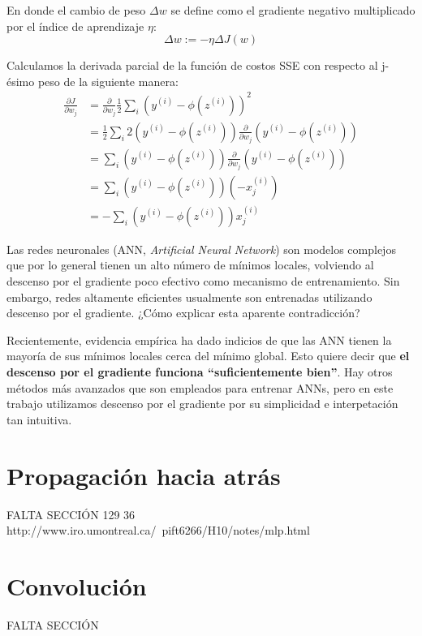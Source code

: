 En donde el cambio de peso $\Delta w$ se define como el gradiente negativo multiplicado
por el índice de aprendizaje $\eta$:
\begin{equation}
  \Delta w := -\eta \Delta J(w)
\end{equation}

Calculamos la derivada parcial de la función de costos SSE con respecto al
j-ésimo peso de la siguiente manera:
\begin{equation*}
\begin{split}
  \frac{\partial J}{\partial w_j} &= \frac{\partial}{\partial w_j}\frac{1}{2}\sum_i (y^{(i)} - \phi(z^{(i)}))^2 \\
  &= \frac{1}{2}\sum_i 2(y^{(i)} - \phi(z^{(i)}))\frac{\partial}{\partial w_j}(y^{(i)} - \phi(z^{(i)}))\\
  &= \sum_i (y^{(i)} - \phi(z^{(i)}))\frac{\partial}{\partial w_j}(y^{(i)} - \phi (z^{(i)}))\\
  &= \sum_i(y^{(i)} - \phi(z^{(i)}))(-x_j^{(i)})\\
  &= -\sum_i(y^{(i)} - \phi(z^{(i)}))x_j^{(i)}
\end{split}
\end{equation*}

Las redes neuronales (ANN, \textit{Artificial Neural Network}) son
modelos complejos que por lo general tienen un alto número de mínimos
locales, volviendo al descenso por el gradiente poco efectivo como
mecanismo de entrenamiento.  Sin embargo, redes altamente eficientes
usualmente son entrenadas utilizando descenso por el gradiente. ¿Cómo
explicar esta aparente contradicción?

Recientemente, evidencia empírica \cite{choromanska} ha dado indicios
de que las ANN tienen la mayoría de sus mínimos locales cerca del
mínimo global.  Esto quiere decir que \textbf{el descenso por el
gradiente funciona ``suficientemente bien''}. Hay otros métodos más
avanzados que son empleados para entrenar ANNs, pero en este trabajo
utilizamos descenso por el gradiente por su simplicidad e
interpetación tan intuitiva.

\section{Propagación hacia atrás}
FALTA SECCIÓN
\cite{haykin} 129
\cite{memes} 36
http://www.iro.umontreal.ca/~pift6266/H10/notes/mlp.html

\section{Convolución}
FALTA SECCIÓN
